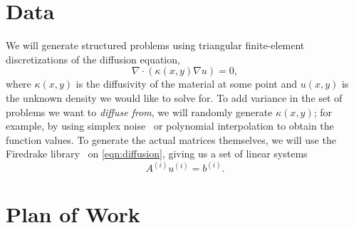 \documentclass{article}
\begin{document}
\section{Data}
We will generate structured problems using triangular finite-element discretizations of the diffusion equation,
\begin{equation}
\nabla \cdot (\kappa(x,y)\nabla u) = 0, \label{eqn:diffusion}
\end{equation}
where $\kappa(x,y)$ is the diffusivity of the material at some point and $u(x,y)$ is the unknown density we would like to solve for.  To add variance in the set of problems we want to \textit{diffuse from}, we will randomly generate $\kappa(x,y)$; for example, by using simplex noise~\cite{simplex} or polynomial interpolation to obtain the function values.  To generate the actual matrices themselves, we will use the Firedrake library~\cite{Firedrake,FRathgeber_etal_2017a} on \cref{eqn:diffusion}, giving us a set of linear systems
\begin{equation}
A^{(i)} u^{(i)} = b^{(i)}.
\end{equation}
%
\section{Plan of Work}
\end{document}
